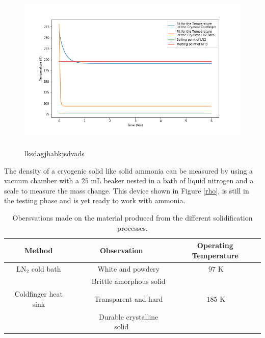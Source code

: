 \documentclass[12pt,notitlepage]{amsart}
\newcommand{\tabitem}{~~\llap{\textbullet}~~}
\begin{document}
\begin{figure}[h]
 \caption{lksdagjhabkjsdvads}
 \label{Tvt_3}
 \centering
  \includegraphics[width = 14cm,height = 8cm]{Temperature_Time_3} 
\end{figure}
The density of a cryogenic solid like solid ammonia can be measured by using a vacuum chamber with a $25$ mL beaker nested in a bath of liquid nitrogen and a scale to measure the mass change. This device shown in Figure \ref{rho}, is still in the testing phase and is yet ready to work with ammonia. 

\begin{center}
\begin{table}[h]
\label{table}
\caption{Obersvations made on the material produced from the different solidification processes. }
\begin{tabular}{|c|c|c|}
\hline
Method & Observation & Operating Temperature \\
\hline
LN$_{2}$ cold bath &  \tabitem White and powdery & $~ 97 $ K \\
&  \tabitem Brittle amorphous solid & \\
\hline
Coldfinger heat sink &  \tabitem Transparent and hard & $~ 185$ K\\
& \tabitem Durable crystalline solid  & \\
\hline
\end{tabular}
\end{table}
\end{center}
\end{document}

